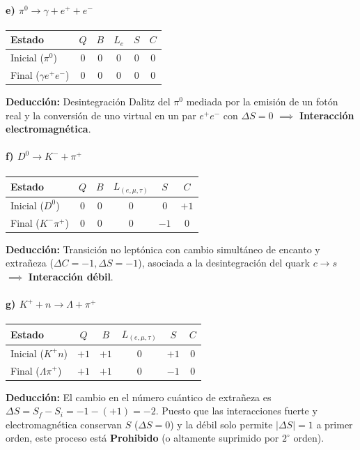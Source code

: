\begin{problema}
\paragraph{e) $\pi^0 \rightarrow \gamma + e^+ + e^-$}
\begin{center}
\small
\begin{tabular}{lccccc}
\toprule
\textbf{Estado} & $Q$ & $B$ & $L_e$ & $S$ & $C$ \\
\midrule
Inicial ($\pi^0$) & $0$ & $0$ & $0$ & $0$ & $0$ \\
Final ($\gamma e^+ e^-$) & $0$ & $0$ & $0$ & $0$ & $0$ \\
\bottomrule
\end{tabular}
\end{center}
\textbf{Deducción:} Desintegración Dalitz del $\pi^0$ mediada por la emisión de un fotón real y la conversión de uno virtual en un par $e^+e^-$ con $\Delta S = 0$ $\implies$ \textbf{Interacción electromagnética}.

\paragraph{f) $D^0 \rightarrow K^- + \pi^+$}
\begin{center}
\small
\begin{tabular}{lccccc}
\toprule
\textbf{Estado} & $Q$ & $B$ & $L_{(e,\mu,\tau)}$ & $S$ & $C$ \\
\midrule
Inicial ($D^0$) & $0$ & $0$ & $0$ & $0$ & $+1$ \\
Final ($K^- \pi^+$) & $0$ & $0$ & $0$ & $-1$ & $0$ \\
\bottomrule
\end{tabular}
\end{center}
\textbf{Deducción:} Transición no leptónica con cambio simultáneo de encanto y extrañeza ($\Delta C = -1, \Delta S = -1$), asociada a la desintegración del quark $c \to s$ $\implies$ \textbf{Interacción débil}.

\paragraph{g) $K^+ + n \rightarrow \Lambda + \pi^+$}
\begin{center}
\small
\begin{tabular}{lccccc}
\toprule
\textbf{Estado} & $Q$ & $B$ & $L_{(e,\mu,\tau)}$ & $S$ & $C$ \\
\midrule
Inicial ($K^+ n$) & $+1$ & $+1$ & $0$ & $+1$ & $0$ \\
Final ($\Lambda \pi^+$) & $+1$ & $+1$ & $0$ & $-1$ & $0$ \\
\bottomrule
\end{tabular}
\end{center}
\textbf{Deducción:} El cambio en el número cuántico de extrañeza es $\Delta S = S_f - S_i = -1 - (+1) = -2$. Puesto que las interacciones fuerte y electromagnética conservan $S$ ($\Delta S = 0$) y la débil solo permite $|\Delta S| = 1$ a primer orden, este proceso está \textbf{Prohibido} (o altamente suprimido por $2^\circ$ orden).


\end{problema}
